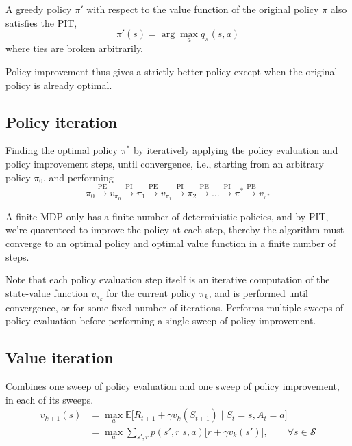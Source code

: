 A greedy policy \( \pi' \) with respect to the value function of the original policy \( \pi \) also satisfies the PIT,
\begin{equation}
    \pi'(s) = \arg\max_{a} q_\pi(s, a)
\end{equation}
where ties are broken arbitrarily.

Policy improvement thus gives a strictly better policy except when the original policy is already optimal.

\subsection{Policy iteration}

Finding the optimal policy \( \pi^* \) by iteratively applying the policy evaluation and policy improvement steps, until convergence, i.e., starting from an arbitrary policy \( \pi_0 \), and performing
\begin{equation}
    \pi_0 \xrightarrow{\text{PE}} v_{\pi_0} \xrightarrow{\text{PI}} \pi_1 \xrightarrow{\text{PE}} v_{\pi_1} \xrightarrow{\text{PI}} \pi_2 \xrightarrow{\text{PE}} \dots \xrightarrow{\text{PI}} \pi^* \xrightarrow{\text{PE}} v_{\pi^*}
\end{equation}

A finite MDP only has a finite number of deterministic policies, and by PIT, we're quarenteed to improve the policy at each step, thereby the algorithm must converge to an optimal policy and optimal value function in a finite number of steps.

Note that each policy evaluation step itself is an iterative computation  of the state-value function \( v_{\pi_k} \) for the current policy \( \pi_k \), and is performed until convergence, or for some fixed number of iterations.
Performs multiple sweeps of policy evaluation before performing a single sweep of policy improvement.

\subsection{Value iteration}

Combines one sweep of policy evaluation and one sweep of policy improvement, in each of its sweeps.
\begin{equation}
    \begin{aligned}
        v_{k+1}(s)
         & =
        \max_{a} \mathbb{E} \big[ R_{t+1} + \gamma v_k(S_{t+1}) \;\big|\; S_t = s, A_t = a \big]
        \\ & =
        \max_{a} \sum_{s', r} p(s', r | s, a) \Big[ r + \gamma v_k(s') \Big]
        , \qquad \forall s \in \mathcal{S}
    \end{aligned}
\end{equation}

